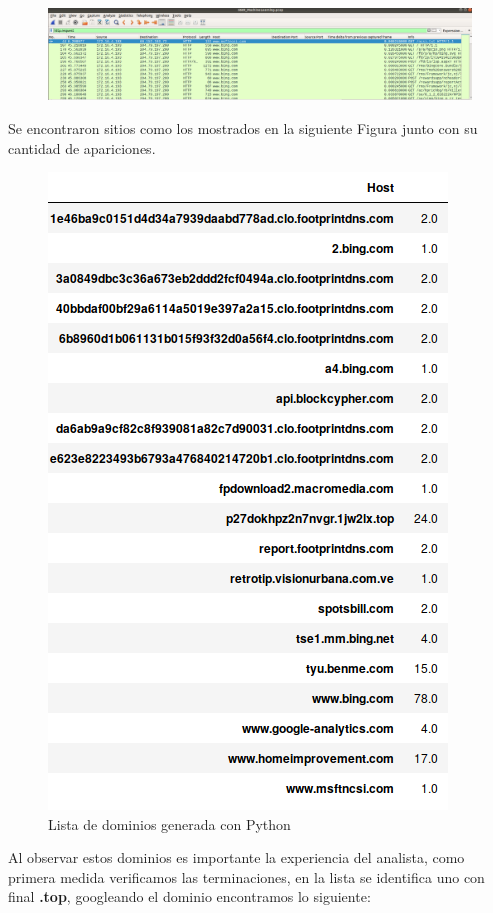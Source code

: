 \documentclass[a4paper,10pt]{article}
\begin{document}
\newpage

\medskip
\begin{figure}[!htp]
\centering
\includegraphics[scale=0.2]{Wireshark/2_1.png} 
\caption{}
\end{figure}

\medskip
Se encontraron sitios como los mostrados en la siguiente Figura junto con su cantidad de apariciones.

\medskip
\begin{figure}[!htp]
\centering
\includegraphics[scale=0.5]{Wireshark/Hosts.png} 
\caption{Lista de dominios generada con Python}
\end{figure}

Al observar estos dominios es importante la experiencia del analista, como primera medida verificamos las terminaciones, en la lista se identifica uno con final \textbf{.top}, googleando el dominio encontramos lo siguiente:
\newpage
\end{document}
